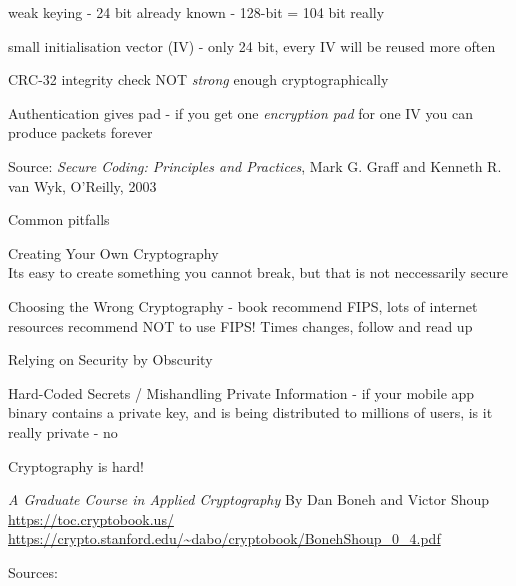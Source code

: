 \documentclass[Screen16to9,17pt]{foils}
\begin{document}






\begin{list1}
\item weak keying - 24 bit already known - 128-bit = 104 bit really
\item small initialisation vector (IV) - only 24 bit, every IV will be reused more often
\item CRC-32 integrity check NOT \emph{strong} enough cryptographically
\item Authentication gives pad - if you get one \emph{encryption pad} for one IV you can produce packets forever
\end{list1}
Source:
\emph{Secure Coding: Principles and Practices}, Mark G. Graff
and Kenneth R. van Wyk, O'Reilly, 2003



Common pitfalls
\begin{list2}
\item Creating Your Own Cryptography\\
Its easy to create something you cannot break, but that is not neccessarily secure
\item Choosing the Wrong Cryptography - book recommend FIPS, lots of internet resources recommend NOT to use FIPS! Times changes, follow and read up
\item Relying on Security by Obscurity
\item Hard-Coded Secrets / Mishandling Private Information - if your mobile app binary contains a private key, and is being distributed to millions of users, is it really private - no
\end{list2}

Cryptography is hard!
\begin{list1}
\item \emph{A Graduate Course in Applied Cryptography} By Dan Boneh and Victor Shoup\\
 \url{https://toc.cryptobook.us/}\\ \url{https://crypto.stanford.edu/~dabo/cryptobook/BonehShoup_0_4.pdf}
\end{list1}



 Sources:\\
{\footnotesize{}\\
\\
\\
}
\end{document}
